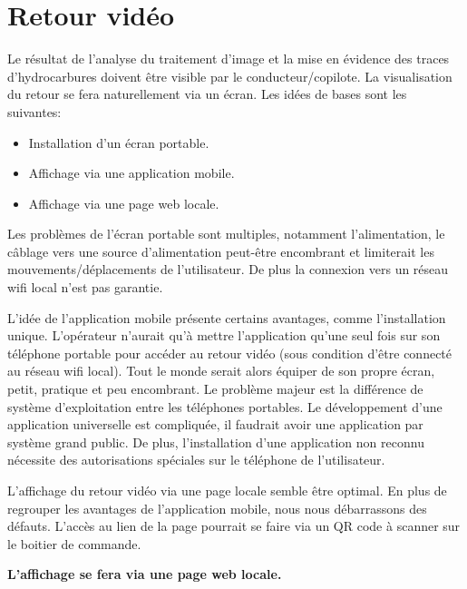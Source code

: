 \section{Retour vidéo}
Le résultat de l'analyse du traitement d'image et la mise en évidence des traces d'hydrocarbures doivent être visible par le conducteur/copilote.
La visualisation du retour se fera naturellement via un écran. Les idées de bases sont les suivantes:
\begin{itemize}
    \item Installation d'un écran portable.
    \item Affichage via une application mobile.
    \item Affichage via une page web locale.
\end{itemize}

Les problèmes de l'écran portable sont multiples, notamment l'alimentation, le câblage vers une source d'alimentation peut-être encombrant
et limiterait les mouvements/déplacements de l'utilisateur. De plus la connexion vers un réseau \Gls{wifi} local n'est pas garantie.

L'idée de l'application mobile présente certains avantages, comme l'installation unique. L'opérateur n'aurait qu'à mettre l'application
qu'une seul fois sur son téléphone portable pour accéder au retour vidéo (sous condition d'être connecté au réseau \Gls{wifi} local).
Tout le monde serait alors équiper de son propre écran, petit, pratique et peu encombrant. Le problème majeur est la différence de système d'exploitation
entre les téléphones portables. Le développement d'une application universelle est compliquée, il faudrait avoir une application par système grand public.
De plus, l'installation d'une application non reconnu nécessite des autorisations spéciales sur le téléphone de l'utilisateur.

L'affichage du retour vidéo via une page locale semble être optimal. En plus de regrouper les avantages de l'application mobile, nous nous débarrassons des défauts.
L'accès au lien de la page pourrait se faire via un QR code à scanner sur le boitier de commande.

\textbf{L'affichage se fera via une page web locale.}

